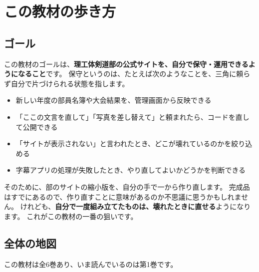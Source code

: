 \chapter{この教材の歩き方}

\section{ゴール}

この教材のゴールは、\textbf{理工体剣道部の公式サイトを、自分で保守・運用できるようになること}です。
保守というのは、たとえば次のようなことを、三角に頼らず自分で片づけられる状態を指します。

\begin{itemize}
  \item 新しい年度の部員名簿や大会結果を、管理画面から反映できる
  \item 「ここの文言を直して」「写真を差し替えて」と頼まれたら、コードを直して公開できる
  \item 「サイトが表示されない」と言われたとき、どこが壊れているのかを絞り込める
  \item 字幕アプリの処理が失敗したとき、やり直してよいかどうかを判断できる
\end{itemize}

そのために、部のサイトの縮小版を、自分の手で一から作り直します。
完成品はすでにあるので、作り直すことに意味があるのか不思議に思うかもしれません。
けれども、\textbf{自分で一度組み立てたものは、壊れたときに直せる}ようになります。
これがこの教材の一番の狙いです。

\section{全体の地図}

この教材は全6巻あり、いま読んでいるのは第1巻です。

